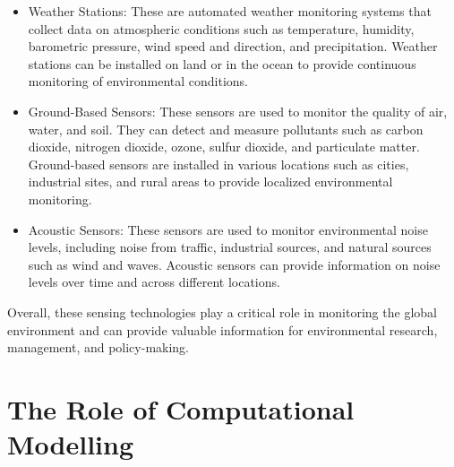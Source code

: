 \begin{itemize}
  \begin{itemize}
  \item Weather Stations: These are automated weather monitoring systems that collect data on atmospheric conditions such as temperature, humidity, barometric pressure, wind speed and direction, and precipitation. Weather stations can be installed on land or in the ocean to provide continuous monitoring of environmental conditions.
  \item Ground-Based Sensors: These sensors are used to monitor the quality of air, water, and soil. They can detect and measure pollutants such as carbon dioxide, nitrogen dioxide, ozone, sulfur dioxide, and particulate matter. Ground-based sensors are installed in various locations such as cities, industrial sites, and rural areas to provide localized environmental monitoring.
  \item Acoustic Sensors: These sensors are used to monitor environmental noise levels, including noise from traffic, industrial sources, and natural sources such as wind and waves. Acoustic sensors can provide information on noise levels over time and across different locations.
  \end{itemize}
\end{itemize}

Overall, these sensing technologies play a critical role in monitoring the global environment and can provide valuable information for environmental research, management, and policy-making.

\section{The Role of Computational Modelling}

